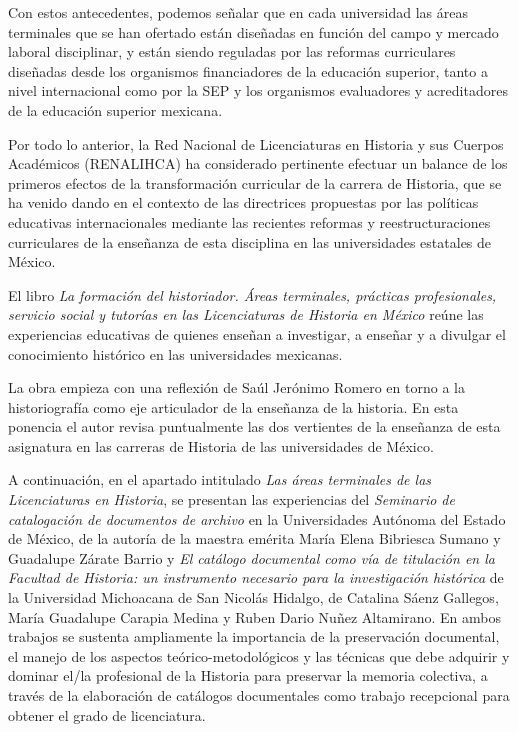 Con estos antecedentes,  podemos señalar que en cada universidad las áreas
terminales que se han ofertado están diseñadas en función del campo y
mercado laboral disciplinar, y están siendo  reguladas por las reformas curriculares diseñadas desde los organismos financiadores de la educación superior, tanto a nivel internacional como por la SEP y los organismos evaluadores y acreditadores de la educación superior mexicana.

Por todo lo anterior, la Red Nacional de Licenciaturas en Historia y sus
Cuerpos Académicos (RENALIHCA) ha considerado pertinente efectuar un balance de los primeros efectos de la transformación curricular de la carrera de Historia,
que se ha venido dando en el contexto de las directrices propuestas por las políticas educativas internacionales mediante las recientes reformas y reestructuraciones curriculares de la enseñanza de esta disciplina en las universidades estatales de México.

El libro \textit{La formación del historiador. Áreas terminales, 
prácticas profesionales, servicio social y tutorías en las
Licenciaturas de Historia en México} reúne las experiencias
educativas de quienes enseñan a investigar, a enseñar y a divulgar el
conocimiento histórico en las universidades mexicanas. 

La obra empieza con una reflexión de Saúl Jerónimo
Romero en torno a la historiografía como eje
articulador de la enseñanza de la historia. En esta ponencia el autor revisa puntualmente las dos vertientes de la enseñanza de esta asignatura en las carreras de Historia de las universidades de México.

A continuación, en el apartado intitulado \textit{Las áreas terminales de las
Licenciaturas en Historia}, se presentan las experiencias del
\textit{Seminario de catalogación de documentos de archivo} en la
Universidades Autónoma del Estado de México, de la autoría de la maestra
emérita María Elena Bibriesca Sumano y Guadalupe Zárate Barrio y \textit{El
catálogo documental como vía de titulación en la Facultad de Historia: un
instrumento necesario para la investigación histórica} de la Universidad
Michoacana de San Nicolás Hidalgo, de Catalina Sáenz
Gallegos, María Guadalupe Carapia Medina y Ruben Dario Nuñez Altamirano. En
ambos trabajos se sustenta ampliamente la importancia de la preservación
documental, el manejo de los aspectos teórico-metodológicos y las técnicas
que debe adquirir y dominar el\slash{}la profesional de la Historia para
preservar la memoria colectiva, a través de la elaboración de catálogos
documentales como trabajo recepcional para obtener el grado de
licenciatura.

